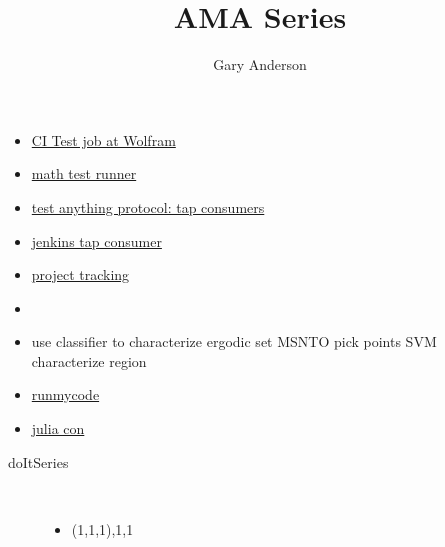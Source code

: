 \documentclass[hyperref]{labbook}
\begin{document}
\frontmatter
\title{AMA Series}
\author{Gary Anderson }
\maketitle

\printindex
\tableofcontents




\mainmatter


  \begin{itemize}
  \item \href{https://www.wolfram.com/company/careers/opportunities/#op-94325-software-developer-in-test}{CI Test job at Wolfram}
  \item \href{https://github.com/lynchs61/Mathematica-Test-Runner}{math test runner}
  \item \href{https://testanything.org/consumers.html}{test anything protocol: tap consumers}
  \item \href{https://wiki.jenkins.io/display/JENKINS/TAP+Plugin}{jenkins tap consumer }
  \item \href{https://www.atlassian.com/software/jira}{project tracking}
  \end{itemize}



\begin{itemize}
\item 
\end{itemize}

\begin{itemize}
\item use classifier to characterize ergodic set  MSNTO pick points SVM characterize region
\end{itemize}


\begin{itemize}
\item \href{http://www.runmycode.org/faq.html}{runmycode}
\item \href{http://juliacon.org/2018/cfp}{julia con}
\end{itemize}


\begin{description}
\item[doItSeries] \ 
  \begin{itemize}
  \item (1,1,1),1,1
  \end{itemize}
\end{description}
\end{document}
